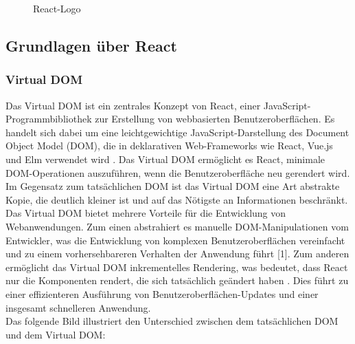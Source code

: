 \begin{figure}[htbp]
	\centering
	\caption{React-Logo}
\end{figure}

\subsection{Grundlagen über React}
\subsubsection{Virtual DOM}
Das Virtual DOM ist ein zentrales Konzept von React, einer JavaScript-Programmbibliothek zur Erstellung von webbasierten Benutzeroberflächen\cite{ReactWikipedia}. Es handelt sich dabei um eine leichtgewichtige JavaScript-Darstellung des Document Object Model (DOM), die in deklarativen Web-Frameworks wie React, Vue.js und Elm verwendet wird \cite{VueJsAdesso}. Das Virtual DOM ermöglicht es React, minimale DOM-Operationen auszuführen, wenn die Benutzeroberfläche neu gerendert wird. Im Gegensatz zum tatsächlichen DOM ist das Virtual DOM eine Art abstrakte Kopie, die deutlich kleiner ist und auf das Nötigste an Informationen beschränkt.\cite{ReactWikipedia}\\
Das Virtual DOM bietet mehrere Vorteile für die Entwicklung von Webanwendungen. Zum einen abstrahiert es manuelle DOM-Manipulationen vom Entwickler, was die Entwicklung von komplexen Benutzeroberflächen vereinfacht und zu einem vorhersehbareren Verhalten der Anwendung führt [1]. Zum anderen ermöglicht das Virtual DOM inkrementelles Rendering, was bedeutet, dass React nur die Komponenten rendert, die sich tatsächlich geändert haben \cite{ReactWikipedia}. Dies führt zu einer effizienteren Ausführung von Benutzeroberflächen-Updates und einer insgesamt schnelleren Anwendung.\\
Das folgende Bild illustriert den Unterschied zwischen dem tatsächlichen DOM und dem Virtual DOM:


